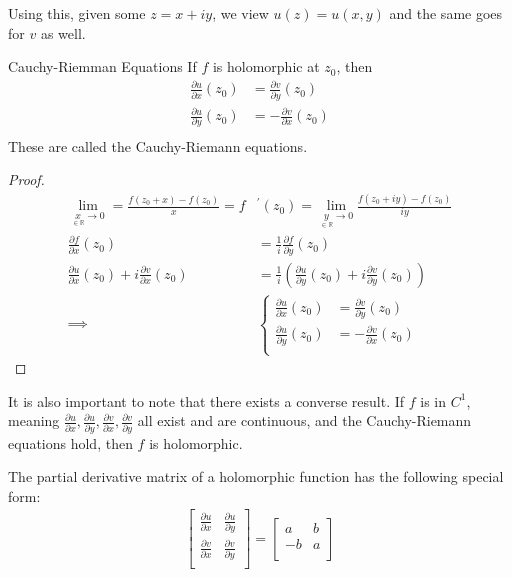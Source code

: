 \documentclass{article}
\begin{document}
Using this, given some \( z = x + iy \), we view \( u(z) = u(x,y) \) and the same goes for \( v \) as well. 

\begin{thrm}{Cauchy-Riemman Equations}{}
If \( f \) is holomorphic at \( z _0 \), then 
\begin{align*}
    \frac{\partial u}{\partial x}(z_0) &= \frac{\partial v}{\partial y}(z_0) \\
    \frac{\partial u}{\partial y}(z_0) &= - \frac{\partial v}{\partial x}(z_0) \\
\end{align*}
These are called the Cauchy-Riemann equations. 
    \tcbline

    \begin{proof}
    \begin{align*}
        \lim_{{\underset{\in \mathbb{R}}{x}  \to 0}} = \frac{f(z_0 + x)- f(z_0)}{x} = f& ^\prime(z_0) = \lim_{\underset{\in \mathbb{R} }{y}  \to 0} \frac{f(z_0+ iy) - f(z_0)}{iy} \\ 
        \frac{\partial f}{\partial x}(z_0) &= \frac{1}{i}\frac{\partial f }{\partial y}(z_0) \\
        \frac{\partial u}{\partial x} (z_0) + i \frac{\partial v}{\partial x} (z_0) &= \frac{1}{i}(\frac{\partial u}{\partial y} (z_0) + i\frac{\partial v}{\partial y} (z_0))  \\
        \implies  &\begin{cases}
        \frac{\partial u}{\partial x}(z_0) &= \frac{\partial v}{\partial y}(z_0) \\
        \frac{\partial u}{\partial y}(z_0) &= - \frac{\partial v}{\partial x}(z_0) \\
        \end{cases}
    \end{align*}
    
    \end{proof}
    \tcbline

    It is also important to note that there exists a converse result. If \( f \) is in \( C^1 \), meaning \( \frac{\partial u}{\partial x} , \frac{\partial u}{\partial y} , \frac{\partial v}{\partial x} , \frac{\partial v}{\partial y}  \) all exist and are continuous, and the Cauchy-Riemann equations hold, then \(  f \) is holomorphic. 
\end{thrm}

The partial derivative matrix of a holomorphic function has the following special form:
\begin{align*}
    \begin{bmatrix}
        \frac{\partial u}{\partial x}  & \frac{\partial u}{\partial y}   \\
         \frac{\partial v}{\partial x} &  \frac{\partial v}{\partial y}  \\
    \end{bmatrix} = \begin{bmatrix}
        a &   b \\
        -b &  a \\
    \end{bmatrix}
\end{align*}
\end{document}

